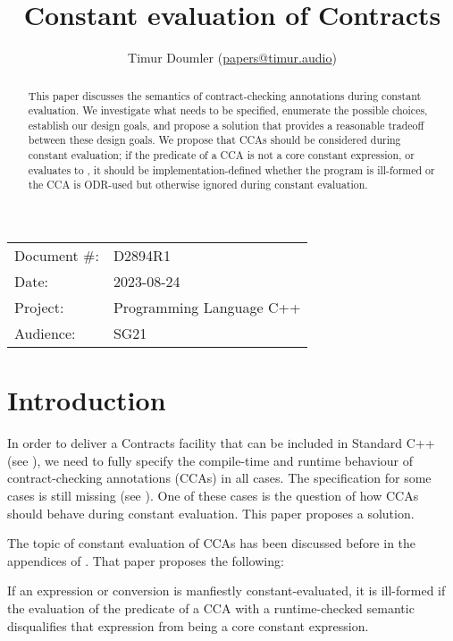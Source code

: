 


\title{Constant evaluation of Contracts}
\author{ Timur Doumler \small(\href{mailto:papers@timur.audio}{papers@timur.audio})}
\date{}
\maketitle

\begin{tabular}{ll}
Document \#: & D2894R1 \\
Date: &2023-08-24 \\
Project: & Programming Language C++ \\
Audience: & SG21
\end{tabular}

\begin{abstract}
This paper discusses the semantics of contract-checking annotations during constant evaluation. We investigate what needs to be specified, enumerate the possible choices, establish our design goals, and propose a solution that provides a reasonable tradeoff between these design goals. We propose that CCAs should be considered during constant evaluation; if the predicate of a CCA is not a core constant expression, or evaluates to , it should be implementation-defined whether the program is ill-formed or the CCA is ODR-used but otherwise ignored during constant evaluation.
\end{abstract}

\section{Introduction}
\label{sec:intro}

In order to deliver a Contracts facility that can be included in Standard C++ (see \cite{P2695R1}), we need to fully specify the compile-time and runtime behaviour of contract-checking annotations (CCAs) in all cases. The specification for some cases is still missing (see \cite{P2896R0}). One of these cases is the question of how CCAs should behave during constant evaluation. This paper proposes a solution.

The topic of constant evaluation of CCAs has been discussed before in the appendices of \cite{P2834R1}. That paper proposes the following:

\begin{adjustwidth}{0.5cm}{0.5cm}
If an expression or conversion is manfiestly constant-evaluated, it is ill-formed if the evaluation of the predicate of a CCA with a runtime-checked semantic disqualifies that expression from being a core constant expression.
\end{adjustwidth}

